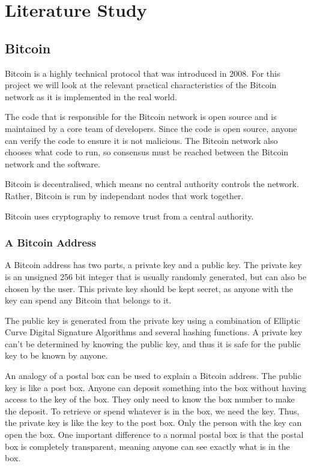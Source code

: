 
\chapter{Literature Study}
\label{chp:literature_study}



\section{Bitcoin}

Bitcoin is a highly technical protocol that was introduced in 2008. For this project we will look at the relevant practical characteristics of the Bitcoin network as it is implemented in the real world.

The code that is responsible for the Bitcoin network is open source and is maintained by a core team of developers. Since the code is open source, anyone can verify the code to ensure it is not malicious. The Bitcoin network also chooses what code to run, so consensus must be reached between the Bitcoin network and the software.

Bitcoin is decentralised, which means no central authority controls the network. Rather, Bitcoin is run by independant nodes that work together.

Bitcoin uses cryptography to remove trust from a central authority.

\subsection{A Bitcoin Address}

A Bitcoin address has two parts, a private key and a public key. The private key is an unsigned 256 bit integer that is usually randomly generated, but can also be chosen by the user. This private key should be kept secret, as anyone with the key can spend any Bitcoin that belongs to it.

The public key is generated from the private key using a combination of Elliptic Curve Digital Signature Algorithms and several hashing functions. A private key can't be determined by knowing the public key, and thus it is safe for the public key to be known by anyone.

An analogy of a postal box can be used to explain a Bitcoin address. The public key is like a post box. Anyone can deposit something into the box without having access to the key of the box. They only need to know the box number to make the deposit. To retrieve or spend whatever is in the box, we need the key. Thus, the private key is like the key to the post box. Only the person with the key can open the box. One important difference to a normal postal box is that the postal box is completely transparent, meaning anyone can see exactly what is in the box.

